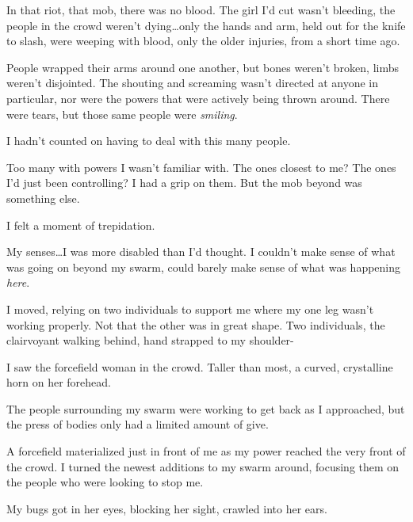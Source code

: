 In that riot, that mob, there was no blood.  The girl I'd cut wasn't bleeding, the people in the crowd weren't dying\ldots only the hands and arm, held out for the knife to slash, were weeping with blood, only the older injuries, from a short time ago.



People wrapped their arms around one another, but bones weren't broken, limbs weren't disjointed.  The shouting and screaming wasn't directed at anyone in particular, nor were the powers that were actively being thrown around.  There were tears, but those same people were \emph{smiling}.



I hadn't counted on having to deal with this many people.



Too many with powers I wasn't familiar with.  The ones closest to me?  The ones I'd just been controlling?  I had a grip on them.  But the mob beyond was something else.



I felt a moment of trepidation.



My senses\ldots I was more disabled than I'd thought.  I couldn't make sense of what was going on beyond my swarm, could barely make sense of what was happening \emph{here}.



I moved, relying on two individuals to support me where my one leg wasn't working properly.  Not that the other was in great shape.  Two individuals, the clairvoyant walking behind, hand strapped to my shoulder-



I saw the forcefield woman in the crowd.  Taller than most, a curved, crystalline horn on her forehead.



The people surrounding my swarm were working to get back as I approached, but the press of bodies only had a limited amount of give.



A forcefield materialized just in front of me as my power reached the very front of the crowd.  I turned the newest additions to my swarm around, focusing them on the people who were looking to stop me.



My bugs got in her eyes, blocking her sight, crawled into her ears.




